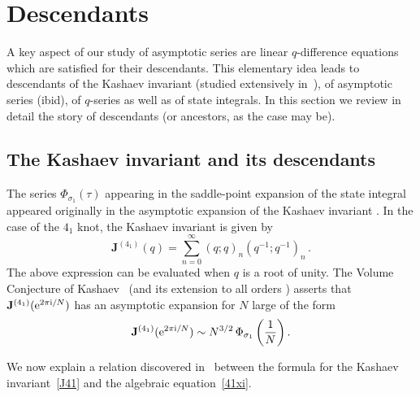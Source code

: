 \documentclass[12pt,reqno]{amsart}
\theoremstyle{definition}
\def\BQ{\mathbbm Q}
\def\s{\sigma}
\def\Vol{\mathrm{Vol}}
\def\be{\begin{equation}}
\def\J{\mathbf J}
\def\ri{\mathrm{i}}
\def\re{{\rm e}}
\def\ri{{\rm i}}
\begin{document}
\section{Descendants}
\label{sec.d}

A key aspect of our study of asymptotic series are linear
$q$-difference equations which are satisfied for their
descendants. This elementary idea leads to descendants of the Kashaev
invariant (studied extensively in~\cite{GZ:kashaev}), of asymptotic
series (ibid), of $q$-series as well as of state integrals. In this
section we review in detail the story of descendants (or ancestors, as
the case may be).

\subsection{The Kashaev invariant and its descendants}
\label{sub.k41}

The series $\Phi_{\s_1} (\tau)$ appearing in the saddle-point
expansion of the state integral appeared originally in the asymptotic
expansion of the Kashaev invariant \cite{K95}. In the case of the
$4_1$ knot, the Kashaev invariant is given by
%
\begin{equation}
\label{J41}
\J^{(4_1)}(q) = \sum_{n=0}^\infty (q;q)_n (q^{-1};q^{-1})_n \,.
\end{equation}
The above expression can be evaluated when $q$ is a root of unity. The
Volume Conjecture of Kashaev~\cite{kas-volume} (and its extension to all orders \cite{gukov}) 
asserts that $\J^{(4_1)}(\re^{2 \pi \ri/N})$ has
an asymptotic expansion for $N$ large of the form
%
\begin{equation}
\label{J41Phi}
\J^{(4_1)}(\re^{2 \pi \ri/N}) \sim N^{3/2}\,
\Phi_{\s_1}\left(\frac{1}{N}\right). 
\end{equation}


We now explain a relation discovered in~\cite{GZ:kashaev} 
between the formula for the Kashaev invariant~\eqref{J41} and the
algebraic equation~\eqref{41xi}.
\end{document}
